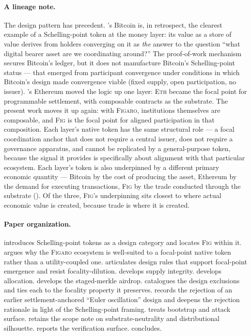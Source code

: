 \documentclass[11pt,a4paper]{article}
\theoremstyle{definition}
\theoremstyle{remark}
\newcommand{\figaro}{\textsc{Figaro}}
\newcommand{\fig}{\textsc{Fig}}
\begin{document}
\paragraph{A lineage note.}
The design pattern has precedent. \citet{nakamoto2008bitcoin}'s
Bitcoin is, in retrospect, the clearest example of a
Schelling-point token at the money layer: its value as a store of
value derives from holders converging on it as \emph{the} answer
to the question ``what digital bearer asset are we
coordinating around?'' The proof-of-work mechanism secures
Bitcoin's ledger, but it does not manufacture Bitcoin's
Schelling-point status --- that emerged from participant
convergence under conditions in which Bitcoin's design made
convergence viable (fixed supply, open participation, no issuer).
\citet{buterin2014ethereum}'s Ethereum moved the logic up one
layer: \textsc{Eth} became the focal point for programmable
settlement, with composable contracts as the substrate. The
present work moves it up again: with \figaro{}, institutions
themselves are composable, and \fig{} is the focal point for
aligned participation in that composition. Each layer's native
token has the same structural role --- a focal coordination
anchor that does not require a central issuer, does not require a
governance apparatus, and cannot be replicated by a
general-purpose token, because the signal it provides is
specifically about alignment with that particular ecosystem.
Each layer's token is also underpinned by a different primary
economic quantity --- Bitcoin by the cost of producing the asset,
Ethereum by the demand for executing transactions, \fig{} by the
trade conducted through the substrate ().
Of the three, \fig{}'s underpinning sits closest to where actual
economic value is created, because trade is where it is created.

\paragraph{Paper organization.}
 introduces Schelling-point tokens as a
design category and locates \fig{} within it.
 argues why the \figaro{} ecosystem is
well-suited to a focal-point native token rather than a
utility-coupled one.
 articulates design rules that support
focal-point emergence and resist focality-dilution.
 develops supply integrity.
 develops allocation.
 develops the staged-merkle airdrop.
 catalogues the design exclusions and ties
each to the focality property it preserves.
 records the rejection of an earlier
settlement-anchored ``Euler oscillation'' design and deepens the
rejection rationale in light of the Schelling-point framing.
 treats bootstrap and attack surface.
 retains the scope note on
substrate-neutrality and distributional silhouette.
 reports the verification surface.
 concludes.
\end{document}
